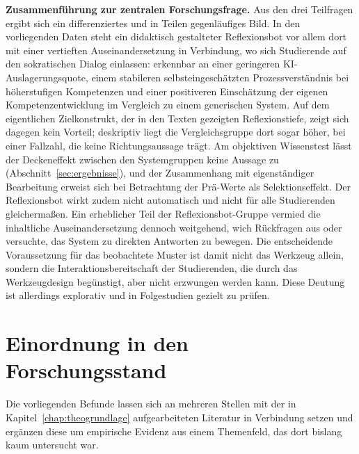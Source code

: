 \textbf{Zusammenführung zur zentralen Forschungsfrage.} Aus den drei Teilfragen ergibt sich ein
differenziertes und in Teilen gegenläufiges Bild. In den vorliegenden Daten steht ein didaktisch
gestalteter Reflexionsbot vor allem dort mit einer vertieften Auseinandersetzung in Verbindung, wo
sich Studierende auf den sokratischen Dialog einlassen: erkennbar an einer geringeren
KI-Auslagerungsquote, einem stabileren selbsteingeschätzten Prozessverständnis bei höherstufigen
Kompetenzen und einer positiveren Einschätzung der eigenen Kompetenzentwicklung im Vergleich zu einem
generischen System. Auf dem eigentlichen Zielkonstrukt, der in den Texten gezeigten Reflexionstiefe,
zeigt sich dagegen kein Vorteil; deskriptiv liegt die Vergleichsgruppe dort sogar höher, bei einer
Fallzahl, die keine Richtungsaussage trägt. Am objektiven Wissenstest lässt der Deckeneffekt
zwischen den Systemgruppen keine Aussage zu (Abschnitt~\ref{sec:ergebnisse}), und der Zusammenhang
mit eigenständiger Bearbeitung erweist sich bei Betrachtung der Prä-Werte als Selektionseffekt. Der
Reflexionsbot wirkt zudem
nicht automatisch und nicht für alle Studierenden gleichermaßen. Ein erheblicher Teil der Reflexionsbot-Gruppe vermied
die inhaltliche Auseinandersetzung dennoch weitgehend, wich Rückfragen aus oder versuchte, das System
zu direkten Antworten zu bewegen. Die entscheidende Voraussetzung für das beobachtete Muster ist
damit nicht das Werkzeug allein, sondern die Interaktionsbereitschaft der Studierenden, die durch das
Werkzeugdesign begünstigt, aber nicht erzwungen werden kann. Diese Deutung ist allerdings explorativ
und in Folgestudien gezielt zu prüfen.

\section{Einordnung in den Forschungsstand}
\label{sec:einordnung-forschungsstand}

Die vorliegenden Befunde lassen sich an mehreren Stellen mit der in Kapitel~\ref{chap:theogrundlage}
aufgearbeiteten Literatur in Verbindung setzen und ergänzen diese um empirische Evidenz aus einem
Themenfeld, das dort bislang kaum untersucht war.


